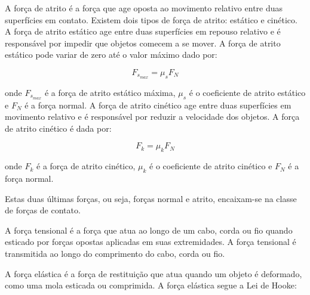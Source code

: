 \documentclass[PhysicsI/physics_notes.tex]{subfiles}
\begin{document}
A força de atrito é a força que age oposta ao movimento relativo entre duas superfícies em contato. Existem dois tipos de força de atrito: estático e cinético.
A força de atrito estático age entre duas superfícies em repouso relativo e é responsável por impedir que objetos comecem a se mover. A força de atrito estático pode variar de zero até o valor máximo dado por:

\begin{equation}
	F_{s_{max}} = \mu_s F_N
\end{equation}

onde $F_{s_{max}}$ é a força de atrito estático máxima, $\mu_s$ é o coeficiente de atrito estático e $F_N$ é a força normal.
A força de atrito cinético age entre duas superfícies em movimento relativo e é responsável por reduzir a velocidade dos objetos. A força de atrito cinético é dada por:

\begin{equation}
	F_k = \mu_k F_N
\end{equation}

onde $F_k$ é a força de atrito cinético, $\mu_k$ é o coeficiente de atrito cinético e $F_N$ é a força normal.
\begin{center}
\end{center}

Estas duas últimas forças, ou seja, forças normal e atrito, encaixam-se na classe de forças de contato.

A força tensional é a força que atua ao longo de um cabo, corda ou fio quando esticado por forças opostas aplicadas em suas extremidades. A força tensional é transmitida ao longo do comprimento do cabo, corda ou fio.
\begin{center}
\end{center}

A força elástica é a força de restituição que atua quando um objeto é deformado, como uma mola esticada ou comprimida. A força elástica segue a Lei de Hooke:
\end{document}
